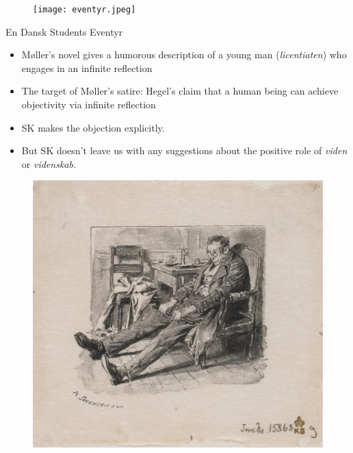 \documentclass[ignorenonframetext, ]{beamer}
\begin{document}
\begin{frame}
  \begin{figure}
    \centering \texttt{[image: eventyr.jpeg]}
  \end{figure}

\end{frame}

\begin{frame}{En Dansk Students Eventyr}

  \begin{itemize}
  \item Møller's novel gives a humorous description of a young man
    (\emph{licentiaten}) who engages in an infinite reflection
  \item The target of Møller's satire: Hegel's claim that a human
    being can achieve objectivity via infinite reflection
  \item SK makes the objection explicitly.
  \item But SK doesn't leave us with any suggestions about the
    positive role of \emph{viden} or \emph{videnskab}.
  \end{itemize}

\end{frame}

\begin{frame}
\begin{figure}
  \centering \includegraphics[scale=0.1]{licentiate.jpg}
\end{figure}
\end{frame}
\end{document}
